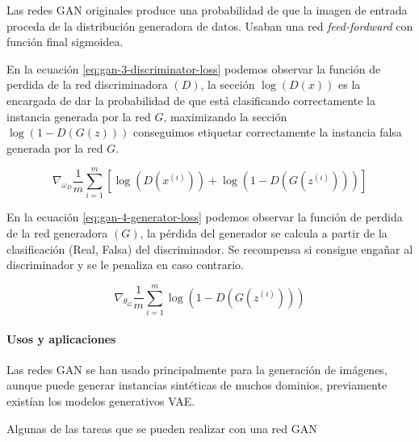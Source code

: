 Las redes \gls{GAN} originales produce una probabilidad de que la imagen de entrada proceda de la distribución generadora de datos. Usaban una red \textit{feed-fordward} con función final sigmoidea.

En la ecuación \ref{eq:gan-3-discriminator-loss} podemos observar la función de perdida de la red discriminadora ${(D)}$, la sección ${\log\left(D(x)\right)}$ es la encargada de dar la probabilidad de que está clasificando correctamente la instancia generada por la red ${G}$, maximizando la sección ${\log\left(1 - D(G(z))\right)}$ conseguimos etiquetar correctamente la instancia falsa generada por la red ${G}$.

\begin{equation}
    \nabla_{\omega_{D}} \frac{1}{m} \sum_{i=1}^{m} \left[ \log\left(D(x^{(i)})\right) + \log\left(1-D(G(z^{(i)}))\right) \right]
    \label{eq:gan-3-discriminator-loss}
\end{equation}

En la ecuación \ref{eq:gan-4-generator-loss} podemos observar la función de perdida de la red generadora ${(G)}$, la pérdida del generador se calcula a partir de la clasificación (Real, Falsa) del discriminador. Se recompensa si consigue engañar al discriminador y se le penaliza en caso contrario.

\begin{equation}
    \nabla_{\theta_{G}} \frac{1}{m} \sum_{i=1}^{m} \log\left(1-D(G(z^{(i)}))\right)
    \label{eq:gan-4-generator-loss}
\end{equation}

\paragraph*{Usos y aplicaciones}

Las redes \gls{GAN} se han usado principalmente para la generación de imágenes, aunque puede generar instancias sintéticas de muchos dominios, previamente existían los modelos generativos \gls{VAE}.


Algunas de las tareas que se pueden realizar con una red \gls{GAN}

